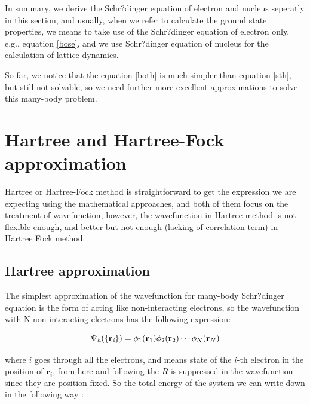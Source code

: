 \documentclass[a4paper, 12pt, titlepage,oneside,drop]{kthesis}
\begin{document}
\noindent In summary, we derive the Schr?dinger equation of electron and nucleus seperatly in this section, and usually, when we refer to calculate the ground state properties,
we means to take use of the Schr?dinger equation of electron only, e.g., equation \ref{bose}, and we use Schr?dinger equation of nucleus for the calculation of lattice dynamics.

So far, we notice that the equation \ref{both} is much simpler than equation \ref{sth}, but still not solvable, so we need further more excellent approximations 
to solve this many-body problem.


\section{Hartree and Hartree-Fock approximation}
\noindent Hartree or Hartree-Fock method is straightforward to get the 
expression we are expecting using the mathematical approaches, and both of them focus on the treatment of wavefunction, however, the wavefunction in Hartree method is not 
flexible enough, and better but not enough (lacking of correlation term) in Hartree Fock method.


\subsection{Hartree approximation}
\label{ha}
\noindent The simplest approximation of the wavefunction for many-body Schr?dinger equation is the form of acting like non-interacting 
electrons, so the wavefunction with N non-interacting electrons has the following expression:

\begin{equation}\label{wfh}
\wfh = \bwf<1><1> \bwf<2><2> \cdots \bwf<N><N> 
\end{equation}

\noindent where $i$ goes through all the electrons, and  means state of the $i$-th electron in the position of ${\textbf{r}}_{\textit{i}}$, 
from here and following the $R$ is suppressed in the wavefunction since they are position fixed. So the total energy of the system we can write down in the following way :
\end{document}
